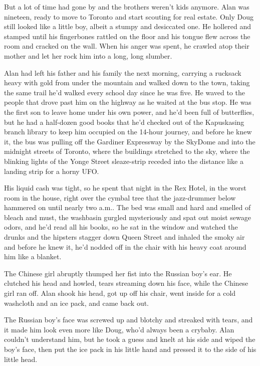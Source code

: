 \documentclass{article}
\begin{document}
But a lot of time had gone by and the brothers weren't kids anymore. 
Alan was nineteen, ready to move to Toronto and start scouting for
real estate.  Only Doug still looked like a little boy, albeit a
stumpy and desiccated one.  He hollered and stamped until his
fingerbones rattled on the floor and his tongue flew across the room
and cracked on the wall.  When his anger was spent, he crawled atop
their mother and let her rock him into a long, long slumber.

Alan had left his father and his family the next morning, carrying a
rucksack heavy with gold from under the mountain and walked down to
the town, taking the same trail he'd walked every school day since he
was five.  He waved to the people that drove past him on the highway
as he waited at the bus stop.  He was the first son to leave home
under his own power, and he'd been full of butterflies, but he had a
half-dozen good books that he'd checked out of the Kapuskasing branch
library to keep him occupied on the 14-hour journey, and before he
knew it, the bus was pulling off the Gardiner Expressway by the
SkyDome and into the midnight streets of Toronto, where the buildings
stretched to the sky, where the blinking lights of the Yonge Street
sleaze-strip receded into the distance like a landing strip for a
horny UFO.

His liquid cash was tight, so he spent that night in the Rex Hotel, in
the worst room in the house, right over the cymbal tree that the
jazz-drummer below hammered on until nearly two a.m..  The bed was
small and hard and smelled of bleach and must, the washbasin gurgled
mysteriously and spat out moist sewage odors, and he'd read all his
books, so he sat in the window and watched the drunks and the hipsters
stagger down Queen Street and inhaled the smoky air and before he knew
it, he'd nodded off in the chair with his heavy coat around him like a
blanket.

The Chinese girl abruptly thumped her fist into the Russian boy's ear. 
He clutched his head and howled, tears streaming down his face, while
the Chinese girl ran off.  Alan shook his head, got up off his chair,
went inside for a cold washcloth and an ice pack, and came back out.

The Russian boy's face was screwed up and blotchy and streaked with
tears, and it made him look even more like Doug, who'd always been a
crybaby.  Alan couldn't understand him, but he took a guess and knelt
at his side and wiped the boy's face, then put the ice pack in his
little hand and pressed it to the side of his little head.
\end{document}
